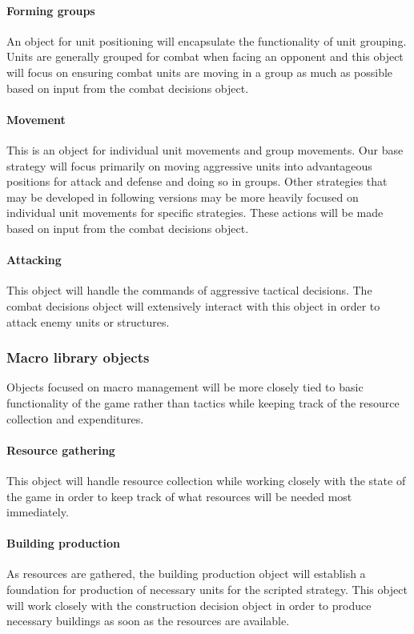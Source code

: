 \paragraph{Forming groups}
An object for unit positioning will encapsulate the functionality of unit grouping. Units are generally grouped for combat when facing an opponent and this object will focus on ensuring combat units are moving in a group as much as possible based on input from the combat decisions object.

\paragraph{Movement}
This is an object for individual unit movements and group movements. Our base strategy will focus primarily on moving aggressive units into advantageous positions for attack and defense and doing so in groups. Other strategies that may be developed in following versions may be more heavily focused on individual unit movements for specific strategies. These actions will be made based on input from the combat decisions object.

\paragraph{Attacking}
This object will handle the commands of aggressive tactical decisions. The combat decisions object will extensively interact with this object in order to attack enemy units or structures.
\vspace{5mm}

\subsubsection{Macro library objects}
Objects focused on macro management will be more closely tied to basic functionality of the game rather than tactics while keeping track of the resource collection and expenditures.

\paragraph{Resource gathering}
This object will handle resource collection while working closely with the state of the game in order to keep track of what resources will be needed most immediately.

\paragraph{Building production}
As resources are gathered, the building production object will establish a foundation for production of necessary units for the scripted strategy. This object will work closely with the construction decision object in order to produce necessary buildings as soon as the resources are available.

